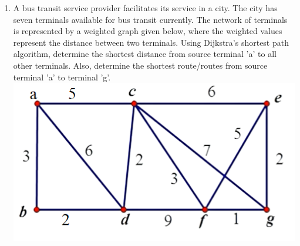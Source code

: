 \begin{enumerate}
	\item A bus transit service provider facilitates its service in a city. The city has seven terminals available for bus transit currently. The network of terminals is represented by a weighted graph given below, where the weighted values represent the distance between two terminals. Using Dijkstra's shortest path algorithm, determine the shortest distance from source terminal 'a' to all other terminals. Also, determine the shortest route/routes from source terminal 'a' to terminal 'g'.
	\includegraphics[scale= 0.7] {gfx/shortestPath2.png}
\end{enumerate}